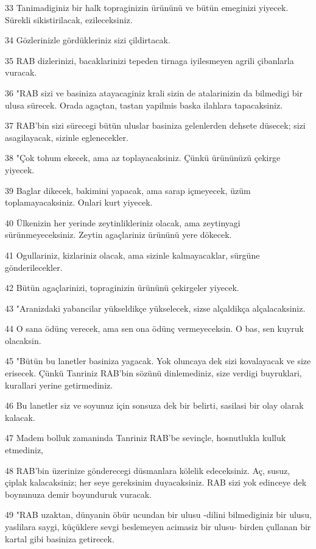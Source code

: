 \par 33 Tanimadiginiz bir halk topraginizin ürününü ve bütün emeginizi yiyecek. Sürekli sikistirilacak, ezileceksiniz.
\par 34 Gözlerinizle gördükleriniz sizi çildirtacak.
\par 35 RAB dizlerinizi, bacaklarinizi tepeden tirnaga iyilesmeyen agrili çibanlarla vuracak.
\par 36 "RAB sizi ve basiniza atayacaginiz krali sizin de atalarinizin da bilmedigi bir ulusa sürecek. Orada agaçtan, tastan yapilmis baska ilahlara tapacaksiniz.
\par 37 RAB'bin sizi sürecegi bütün uluslar basiniza gelenlerden dehsete düsecek; sizi asagilayacak, sizinle eglenecekler.
\par 38 "Çok tohum ekecek, ama az toplayacaksiniz. Çünkü ürününüzü çekirge yiyecek.
\par 39 Baglar dikecek, bakimini yapacak, ama sarap içmeyecek, üzüm toplamayacaksiniz. Onlari kurt yiyecek.
\par 40 Ülkenizin her yerinde zeytinlikleriniz olacak, ama zeytinyagi sürünmeyeceksiniz. Zeytin agaçlariniz ürününü yere dökecek.
\par 41 Ogullariniz, kizlariniz olacak, ama sizinle kalmayacaklar, sürgüne gönderilecekler.
\par 42 Bütün agaçlarinizi, topraginizin ürününü çekirgeler yiyecek.
\par 43 "Aranizdaki yabancilar yükseldikçe yükselecek, sizse alçaldikça alçalacaksiniz.
\par 44 O sana ödünç verecek, ama sen ona ödünç vermeyeceksin. O bas, sen kuyruk olacaksin.
\par 45 "Bütün bu lanetler basiniza yagacak. Yok oluncaya dek sizi kovalayacak ve size erisecek. Çünkü Tanriniz RAB'bin sözünü dinlemediniz, size verdigi buyruklari, kurallari yerine getirmediniz.
\par 46 Bu lanetler siz ve soyunuz için sonsuza dek bir belirti, sasilasi bir olay olarak kalacak.
\par 47 Madem bolluk zamaninda Tanriniz RAB'be sevinçle, hosnutlukla kulluk etmediniz,
\par 48 RAB'bin üzerinize gönderecegi düsmanlara kölelik edeceksiniz. Aç, susuz, çiplak kalacaksiniz; her seye gereksinim duyacaksiniz. RAB sizi yok edinceye dek boynunuza demir boyunduruk vuracak.
\par 49 "RAB uzaktan, dünyanin öbür ucundan bir ulusu -dilini bilmediginiz bir ulusu, yaslilara saygi, küçüklere sevgi beslemeyen acimasiz bir ulusu- birden çullanan bir kartal gibi basiniza getirecek.

